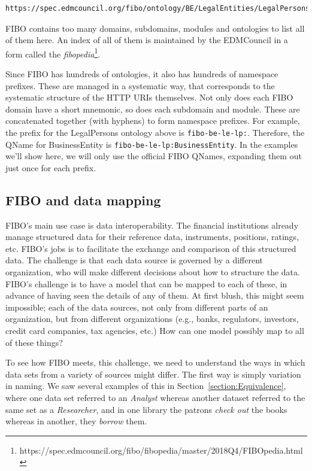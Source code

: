 \begin{lstlisting}
https://spec.edmcouncil.org/fibo/ontology/BE/LegalEntities/LegalPersons/BusinessEntity
\end{lstlisting}

FIBO contains too many domains, subdomains, modules and ontologies to list all of them here. An index of all of them
is maintained by the EDMCouncil in a form called 
the \emph{fibopedia}\footnote{https://spec.edmcouncil.org/fibo/fibopedia/master/2018Q4/FIBOpedia.html}.  

Since FIBO has hundreds of ontologies, it also has hundreds of namespace prefixes.  These are managed in a systematic way,
that corresponds to the systematic structure of the HTTP URIs themselves.  Not only does each FIBO domain have a short mnemonic, so 
does each subdomain and module.  These are concatenated together (with hyphens) to form namespace prefixes.  For example, the 
prefix for the LegalPersons ontology above is \texttt{fibo-be-le-lp:}.  Therefore, the QName for BusinessEntity 
is \texttt{fibo-be-le-lp:BusinessEntity}.  In the examples we'll show here, we will only use the official FIBO QNames, expanding
them out just once for each prefix. 

\subsection{FIBO and data mapping}

FIBO's main use case is data interoperability.  The financial institutions already manage structured data for their reference
data, instruments, positions, ratings, etc.  FIBO's jobs is to facilitate the exchange and comparison of this structured data. 
The challenge is that each data source is governed by a different organization, who will make different decisions about how to 
structure the data.  FIBO's challenge is to have a model that can be mapped to each of these, in advance of having seen the details 
of any of them.   At first blush, this might seem impossible; each of the data sources, not only from different parts of an organization, but 
from different organizations (e.g., banks, regulators, investors, credit card companies, tax agencies, etc.)  How can one model 
possibly map to all of these things?

To see how FIBO meets, this challenge, we need to understand the ways in which data sets from a variety of sources might differ.  
The first way is simply variation in naming.    We saw several examples of this in Section~\ref{section:Equivalence}, where one
data set referred to an \emph{Analyst} whereas another dataset referred to the same set as a \emph{Researcher}, and in one library 
the patrons \emph{check out} the books whereas in another, they \emph{borrow} them.  

